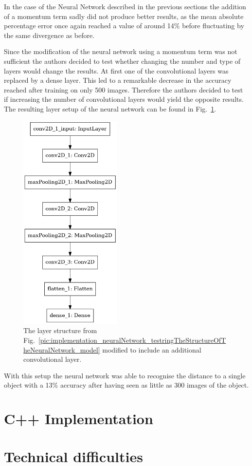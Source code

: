 In the case of the Neural Network described in the previous sections the addition of a momentum term sadly did not produce better results, as the mean absolute percentage error once again reached a value of around 14\% before fluctuating by the same divergence as before.

Since the modification of the neural network using a momentum term was not sufficient the authors decided to test whether changing the number and type of layers would change the results. At first one of the convolutional layers was replaced by a dense layer. This led to a remarkable decrease in the accuracy reached after training on only 500 images. Therefore the authors decided to test if increasing the number of convolutional layers would yield the opposite results. The resulting layer setup of the neural network can be found in Fig.~\ref{pic:implementation_neuralNetwork_modificationsToTheNN_model}.

\begin{figure}[h!]
	\centering
	\includegraphics[width=2in]{img/implementation_neuralNetwork_modificationsToTheNN_model.png}
	\caption{The layer structure from Fig.~\ref{pic:implementation_neuralNetwork_testringTheStructureOfTheNeuralNetwork_model} modified to include an additional convolutional layer.}
	\label{pic:implementation_neuralNetwork_modificationsToTheNN_model}
\end{figure}

With this setup the neural network was able to recognise the distance to a single object with a 13\% accuracy after having seen as little as 300 images of the object.

\section{C++ Implementation}

\section{Technical difficulties}

\filbreak
